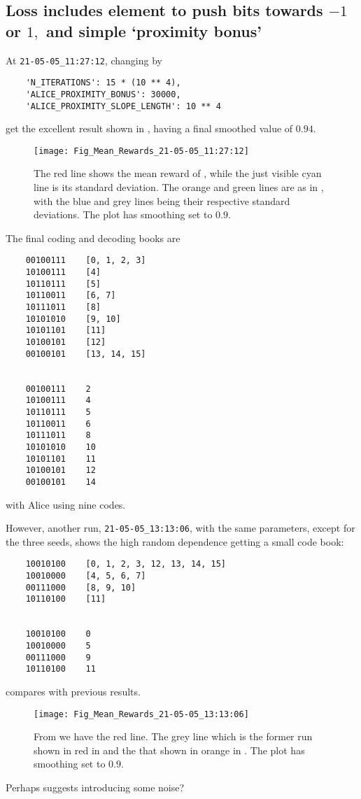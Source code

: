 \documentclass[12pt]{article}
\begin{document}
\subsection{Loss includes element to push bits towards $-1$ or $1,$ and simple `proximity bonus'}

At \verb|21-05-05_11:27:12|, changing  by 
\begin{lstlisting}
	'N_ITERATIONS': 15 * (10 ** 4),
	'ALICE_PROXIMITY_BONUS': 30000,
	'ALICE_PROXIMITY_SLOPE_LENGTH': 10 ** 4
\end{lstlisting}
get the excellent result shown in , having a final smoothed value of $0.94.$
\begin{figure}
	\centering
	\texttt{[image: Fig\_Mean\_Rewards\_21-05-05\_11:27:12]}
	\caption{The red line shows the mean reward of , while the just visible cyan line is its standard deviation.  The orange and green lines are as in , with the blue and grey lines being their respective standard deviations. The plot has smoothing set to $0.9.$}
	\label{fig:figmeanrewards21-05-05112712}
\end{figure}
The final coding and decoding books are
\begin{lstlisting}
	00100111	[0, 1, 2, 3]
	10100111	[4]
	10110111	[5]
	10110011	[6, 7]
	10111011	[8]
	10101010	[9, 10]
	10101101	[11]
	10100101	[12]
	00100101	[13, 14, 15]
	
	
	00100111	2
	10100111	4
	10110111	5
	10110011	6
	10111011	8
	10101010	10
	10101101	11
	10100101	12
	00100101	14
\end{lstlisting}
with Alice using nine codes.

However, another run, \verb|21-05-05_13:13:06|, with the same parameters, except for the three seeds, shows the high random dependence getting a small code book:
\begin{lstlisting}
	10010100	[0, 1, 2, 3, 12, 13, 14, 15]
	10010000	[4, 5, 6, 7]
	00111000	[8, 9, 10]
	10110100	[11]
	
	
	10010100	0
	10010000	5
	00111000	9
	10110100	11
\end{lstlisting}
 compares with previous results.
\begin{figure}
	\centering
	\texttt{[image: Fig\_Mean\_Rewards\_21-05-05\_13:13:06]}
	\caption{From  we have the red line. The grey line which is the former run shown in red in  and the that shown in orange in .  The plot has smoothing set to $0.9.$} 
	\label{fig:figmeanrewards21-05-05131306}
\end{figure}
Perhaps suggests introducing some noise?
\end{document}
